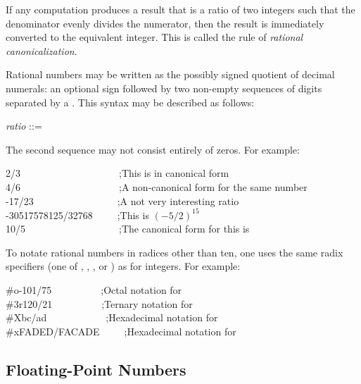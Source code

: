 If any computation produces a result that is a ratio of
two integers such that the denominator evenly divides the
numerator, then the result is immediately converted to the equivalent
integer.  This is called the rule of {\it rational canonicalization}.

Rational numbers may be written as the possibly signed quotient of
decimal numerals: an optional sign followed by two non-empty sequences of
digits separated by a \cd{/}.  This syntax may be described as
follows:
\begin{tabbing}
{\it ratio} ::=   \cd{/} 
\end{tabbing}
The second sequence may not consist
entirely of zeros.
For example:
\begin{lisp}
2/3~~~~~~~~~~~~~~~~~~~~;{\rm This is in canonical form} \\
4/6~~~~~~~~~~~~~~~~~~~~;{\rm A non-canonical form for the same number} \\
-17/23~~~~~~~~~~~~~~~~~;{\rm A not very interesting ratio} \\
-30517578125/32768~~~~~;{\rm This is \((-5/2)^{15}\)} \\
10/5~~~~~~~~~~~~~~~~~~~;{\rm The canonical form for this is }
\end{lisp}

To notate rational numbers in radices other than ten,
one uses the same radix specifiers
(one of , , , or ) as for integers.
For example:
\begin{lisp}
\#o-101/75~~~~~~~~~~;{\rm Octal notation for } \\
\#3r120/21~~~~~~~~~~;{\rm Ternary notation for } \\
\#Xbc/ad~~~~~~~~~~~~;{\rm Hexadecimal notation for } \\
\#xFADED/FACADE~~~~~;{\rm Hexadecimal notation for }
\end{lisp}

\subsection{Floating-Point Numbers}

